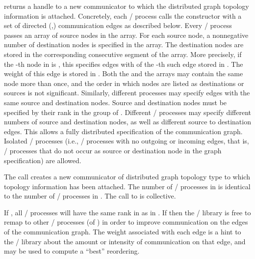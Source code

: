  returns a handle to a new
communicator to which the distributed graph topology information is
attached. Concretely, each \MPI/ process calls the constructor with a set of
directed (,) communication edges as
described below. Every \MPI/ process passes an array of  source
nodes in the  array.  For each source node, a
nonnegative number of destination nodes is specified in the
 array. The destination nodes are stored in the
corresponding consecutive segment of the 
array. More precisely, if the -th node in  is
, this specifies  edges 
with  of the -th such edge stored in
. The weight of
this edge is stored in
.  Both the
 and the  arrays may contain the
same node more than once, and the order in which nodes are listed as
destinations or sources is not significant. Similarly, different
processes may specify edges with the same source and destination
nodes. Source and destination nodes must be
specified by their rank in the group of .
Different \MPI/ processes may specify different numbers
of source and destination nodes, as well as different source to
destination edges.  This allows a fully distributed specification of
the communication graph.  Isolated \MPI/ processes (i.e., \MPI/ processes with no
outgoing or incoming edges, that is, \MPI/ processes that do not occur as
source or destination node in the graph specification) are allowed.

The call creates a new communicator  of
distributed graph topology type to which topology information has been
attached. The number of \MPI/ processes in  is
identical to the number of \MPI/ processes in . The call to
 is collective.

If , all \MPI/ processes will have the same rank in
 as in . If
 then the \MPI/ library is free to remap to
other \MPI/ processes (of ) in order to improve
communication on the edges of the communication graph. The weight
associated with each edge is a hint to the \MPI/ library about the
amount or intensity of communication on that edge, and may be used to
compute a ``best'' reordering.

